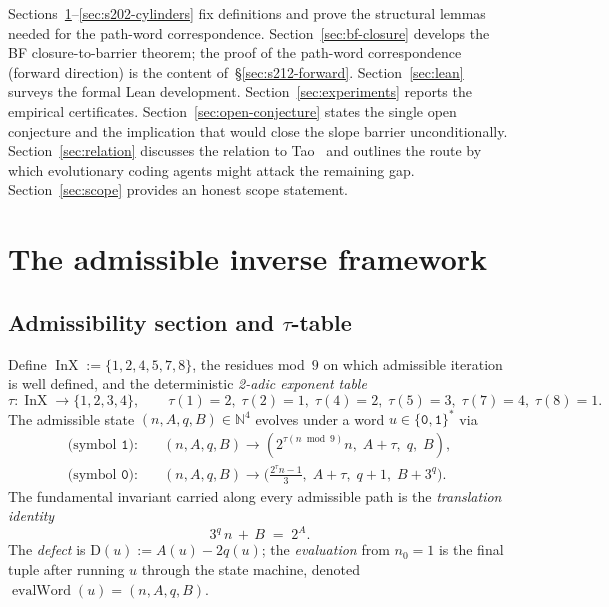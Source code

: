 \documentclass[11pt,a4paper]{article}
\theoremstyle{plain}
\theoremstyle{definition}
\newcommand{\NN}{\mathbb{N}}
\newcommand{\defect}{\mathrm{D}}
\DeclareMathOperator{\InX}{InX}
\DeclareMathOperator{\evalWord}{evalWord}
\begin{document}
Sections~\ref{sec:framework}--\ref{sec:s202-cylinders} fix definitions
and prove the structural lemmas needed for the path-word
correspondence. Section~\ref{sec:bf-closure} develops the BF
closure-to-barrier theorem; the proof of the path-word correspondence
(forward direction) is the content of~\S\ref{sec:s212-forward}.
Section~\ref{sec:lean} surveys the formal Lean development.
Section~\ref{sec:experiments} reports the empirical certificates.
Section~\ref{sec:open-conjecture} states the single open conjecture
and the implication that would close the slope barrier
unconditionally. Section~\ref{sec:relation} discusses the relation to
Tao~\cite{tao2022} and outlines the route by which evolutionary
coding agents might attack the remaining gap.
Section~\ref{sec:scope} provides an honest scope statement.

\section{The admissible inverse framework}\label{sec:framework}

\subsection{Admissibility section and \texorpdfstring{$\tau$}{tau}-table}

Define $\InX := \{1, 2, 4, 5, 7, 8\}$, the residues mod~$9$ on which
admissible iteration is well defined, and the deterministic
\emph{2-adic exponent table}
\[
  \tau : \InX \to \{1,2,3,4\}, \qquad
  \tau(1) = 2,\;\tau(2) = 1,\;\tau(4) = 2,\;
  \tau(5) = 3,\;\tau(7) = 4,\;\tau(8) = 1.
\]
The admissible state $(n, A, q, B) \in \NN^4$ evolves under a word
$u \in \{\mathtt{0}, \mathtt{1}\}^*$ via
\begin{align*}
  \text{(symbol $\mathtt{1}$):} &\quad
     (n, A, q, B) \to (2^{\tau(n \bmod 9)} n,\; A + \tau,\; q,\; B), \\
  \text{(symbol $\mathtt{0}$):} &\quad
     (n, A, q, B) \to
       \bigl(\tfrac{2^{\tau} n - 1}{3},\;
             A + \tau,\;
             q+1,\;
             B + 3^q\bigr).
\end{align*}
The fundamental invariant carried along every admissible path is the
\emph{translation identity}
\[
  3^q\, n \,+\, B \;=\; 2^A.
\tag{Inv-Id}\label{eq:invid}
\]
The \emph{defect} is $\defect(u) := A(u) - 2 q(u)$; the
\emph{evaluation} from $n_0 = 1$ is the final tuple after running $u$
through the state machine, denoted $\evalWord(u) = (n, A, q, B)$.
\end{document}
